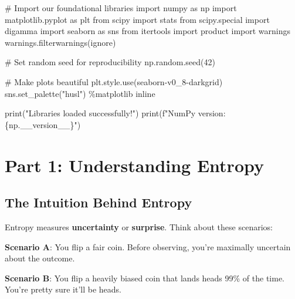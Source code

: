 \documentclass[
  11pt,
  letterpaper,
  oneside,
  openany]{book}
\newenvironment{Shaded}{\begin{snugshade}}{\end{snugshade}}
\newcommand{\BuiltInTok}[1]{\textcolor[rgb]{0.00,0.23,0.31}{#1}}
\newcommand{\CommentTok}[1]{\textcolor[rgb]{0.37,0.37,0.37}{#1}}
\newcommand{\DecValTok}[1]{\textcolor[rgb]{0.68,0.00,0.00}{#1}}
\newcommand{\ImportTok}[1]{\textcolor[rgb]{0.00,0.46,0.62}{#1}}
\newcommand{\NormalTok}[1]{\textcolor[rgb]{0.00,0.23,0.31}{#1}}
\newcommand{\OperatorTok}[1]{\textcolor[rgb]{0.37,0.37,0.37}{#1}}
\newcommand{\SpecialCharTok}[1]{\textcolor[rgb]{0.37,0.37,0.37}{#1}}
\newcommand{\SpecialStringTok}[1]{\textcolor[rgb]{0.13,0.47,0.30}{#1}}
\newcommand{\StringTok}[1]{\textcolor[rgb]{0.13,0.47,0.30}{#1}}
\begin{document}
\begin{Shaded}
\begin{Highlighting}[]
\CommentTok{\# Import our foundational libraries}
\ImportTok{import}\NormalTok{ numpy }\ImportTok{as}\NormalTok{ np}
\ImportTok{import}\NormalTok{ matplotlib.pyplot }\ImportTok{as}\NormalTok{ plt}
\ImportTok{from}\NormalTok{ scipy }\ImportTok{import}\NormalTok{ stats}
\ImportTok{from}\NormalTok{ scipy.special }\ImportTok{import}\NormalTok{ digamma}
\ImportTok{import}\NormalTok{ seaborn }\ImportTok{as}\NormalTok{ sns}
\ImportTok{from}\NormalTok{ itertools }\ImportTok{import}\NormalTok{ product}
\ImportTok{import}\NormalTok{ warnings}
\NormalTok{warnings.filterwarnings(}\StringTok{\textquotesingle{}ignore\textquotesingle{}}\NormalTok{)}

\CommentTok{\# Set random seed for reproducibility}
\NormalTok{np.random.seed(}\DecValTok{42}\NormalTok{)}

\CommentTok{\# Make plots beautiful}
\NormalTok{plt.style.use(}\StringTok{\textquotesingle{}seaborn{-}v0\_8{-}darkgrid\textquotesingle{}}\NormalTok{)}
\NormalTok{sns.set\_palette(}\StringTok{"husl"}\NormalTok{)}
\OperatorTok{\%}\NormalTok{matplotlib inline}

\BuiltInTok{print}\NormalTok{(}\StringTok{"Libraries loaded successfully!"}\NormalTok{)}
\BuiltInTok{print}\NormalTok{(}\SpecialStringTok{f"NumPy version: }\SpecialCharTok{\{}\NormalTok{np}\SpecialCharTok{.}\NormalTok{\_\_version\_\_}\SpecialCharTok{\}}\SpecialStringTok{"}\NormalTok{)}
\end{Highlighting}
\end{Shaded}

\section{Part 1: Understanding
Entropy}\label{part-1-understanding-entropy}

\subsection{The Intuition Behind
Entropy}\label{the-intuition-behind-entropy}

Entropy measures \textbf{uncertainty} or \textbf{surprise}. Think about
these scenarios:

\textbf{Scenario A}: You flip a fair coin. Before observing, you're
maximally uncertain about the outcome.

\textbf{Scenario B}: You flip a heavily biased coin that lands heads
99\% of the time. You're pretty sure it'll be heads.
\end{document}
